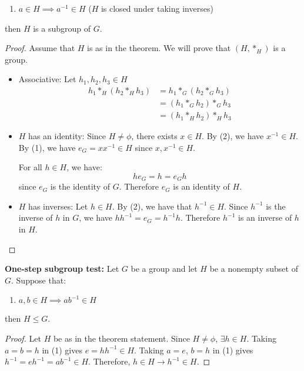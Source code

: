 \begin{itemize}
\begin{theorem}
\begin{enumerate}
            \item $a\in H \implies a^{-1} \in H$ ($H$ is closed under taking inverses)
        \end{enumerate}
        then $H$ is a subgroup of $G$.
    \end{theorem}
    \begin{proof}
        Assume that $H$ is as in the theorem. We will prove that $(H, *_H)$ is a group.
        \begin{itemize}
            \item Associative: Let $h_1, h_2, h_3 \in H$
            \begin{align}
                h_1 *_H (h_2 *_H h_3) &= h_1 *_G (h_2 *_G h_3) \\
                &= (h_1 *_G h_2) *_G h_3 \\ 
                &= (h_1 *_H h_2) *_H h_3
            \end{align}
            \item $H$ has an identity: Since $H \neq \phi$, there exists $x\in H$. By (2), we have $x^{-1} \in H$. By (1), we have $e_G = xx^{-1} \in H$ since $x,x^{-1} \in H$.
            
            For all $h\in H$, we have:
            \begin{equation}
                he_G = h = e_G h
            \end{equation}
            since $e_G$ is the identity of $G$. Therefore $e_G$ is an identity of $H$.
            \item $H$ has inverses: Let $h \in H$. By (2), we have that $h^{-1} \in H$. Since $h^{-1}$ is the inverse of $h$ in $G$, we have $hh^{-1}=e_G = h^{-1}h$. Therefore $h^{-1}$ is an inverse of $h$ in $H$.
        \end{itemize}
    \end{proof}
    \begin{theorem}
        \textbf{One-step subgroup test:} Let $G$ be a group and let $H$ be a nonempty subset of $G$.  Suppose that:
        \begin{enumerate}
            \item $a,b\in H \implies ab^{-1} \in H$
        \end{enumerate}
        then $H \leq G$.
    \end{theorem}
    \begin{proof}
        Let $H$ be as in the theorem statement. Since $H \neq \phi$, $\exists h \in H$. Taking $a=b=h$ in (1) gives $e=hh^{-1} \in H$. Taking $a=e$, $b=h$ in (1) gives $h^{-1}=eh^{-1}=ab^{-1} \in H$. Therefore, $h\in H \rightarrow h^{-1} \in H$.


\end{proof}
\end{itemize}
